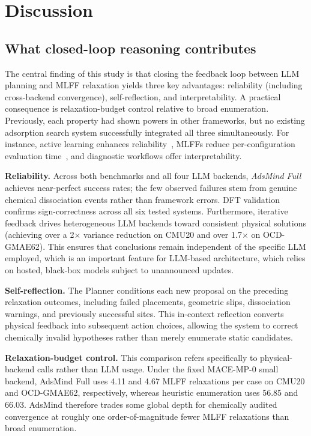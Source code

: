 \section{Discussion}

\subsection{What closed-loop reasoning contributes}

The central finding of this study is that closing the feedback loop between LLM planning and MLFF relaxation yields three key advantages: reliability (including cross-backend convergence), self-reflection, and interpretability. A practical consequence is relaxation-budget control relative to broad enumeration. Previously, each property had shown powers in other frameworks, but no existing adsorption search system successfully integrated all three simultaneously. For instance, active learning enhances reliability~\cite{settles2012active}, MLFFs reduce per-configuration evaluation time~\cite{lan2023adsorbml}, and diagnostic workflows offer interpretability.

\textbf{Reliability.} Across both benchmarks and all four LLM backends, \textit{AdsMind Full} achieves near-perfect success rates; the few observed failures stem from genuine chemical dissociation events rather than framework errors. DFT validation confirms sign-correctness across all six tested systems. Furthermore, iterative feedback drives heterogeneous LLM backends toward consistent physical solutions (achieving over a 2$\times$ variance reduction on CMU20 and over 1.7$\times$ on OCD-GMAE62). This ensures that conclusions remain independent of the specific LLM employed, which is an important feature for LLM-based architecture, which relies on hosted, black-box models subject to unannounced updates.

\textbf{Self-reflection.} The Planner conditions each new proposal on the preceding relaxation outcomes, including failed placements, geometric slips, dissociation warnings, and previously successful sites. This in-context reflection converts physical feedback into subsequent action choices, allowing the system to correct chemically invalid hypotheses rather than merely enumerate static candidates.

\textbf{Relaxation-budget control.} This comparison refers specifically to physical-backend calls rather than LLM usage. Under the fixed MACE-MP-0 small backend, AdsMind Full uses 4.11 and 4.67 MLFF relaxations per case on CMU20 and OCD-GMAE62, respectively, whereas heuristic enumeration uses 56.85 and 66.03. AdsMind therefore trades some global depth for chemically audited convergence at roughly one order-of-magnitude fewer MLFF relaxations than broad enumeration.

